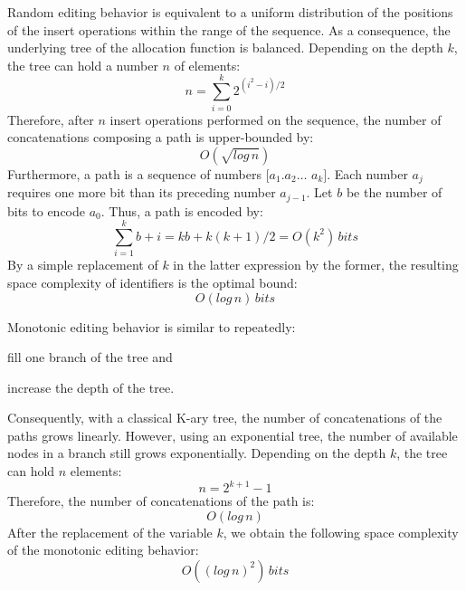 \begin{asparadesc}
\item [Random editing behavior] is equivalent to a uniform distribution of the
  positions of the insert operations within the range of the sequence. As a
  consequence, the underlying tree of the allocation function is
  balanced. Depending on the depth $k$, the tree can hold a number $n$ of
  elements: \begin{equation} n = \sum\limits_{i=0}^{k}
    {2^{(i^2-i)/2}} \end{equation} Therefore, after $n$ insert operations
  performed on the sequence, the number of concatenations composing a path is
  upper-bounded by:
  \begin{equation} O(\sqrt{log\,n}) \end{equation} Furthermore, a path is a
  sequence of numbers $[a_1.a_2\ldots$ $a_k]$. Each number $a_j$ requires one
  more bit than its preceding number $a_{j-1}$. Let $b$ be the number of bits
  to encode $a_0$. Thus, a path is encoded by:
  \begin{equation} \sum\limits_{i=1}^{k}b+i = kb + k(k+1)/2 = O(k^2) \,
    bits \end{equation} By a simple replacement of $k$ in the latter expression
  by the former, the resulting space complexity of identifiers is the optimal
  bound:
  \begin{equation} O(log\,n) \, bits \end{equation}
  
\item[Monotonic editing behavior] is similar to repeatedly:
  \begin{inparaenum}[(i)]
  \item fill one branch of the tree and
  \item increase the depth of the tree.
  \end{inparaenum} Consequently, with a classical K-ary tree, the number of
  concatenations of the paths grows linearly. However, using an
  exponential tree, the number of available nodes in a branch still grows
  exponentially. Depending on the depth $k$, the tree can hold $n$ elements:
  \begin{equation} n = 2^{k+1}-1 \end{equation} Therefore, the number of
  concatenations of the path is:
  \begin{equation} O(log\,n) \end{equation} After the replacement of the
  variable $k$, we obtain the following space complexity of the monotonic
  editing behavior:
  \begin{equation} O((log\,n)^2) \, bits \end{equation}


\end{asparadesc}
